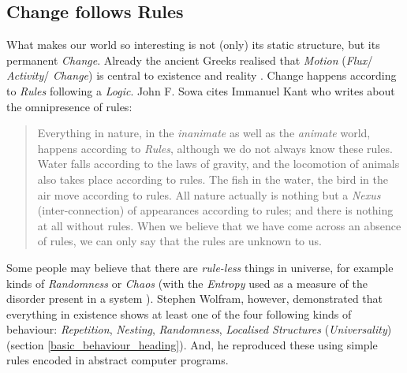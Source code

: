 %
%
%
%
%
%
%

\subsection{Change follows Rules}
\label{change_follows_rules_heading}

What makes our world so interesting is not (only) its static structure, but its
permanent \emph{Change}. Already the ancient Greeks realised that \emph{Motion}
(\emph{Flux}/ \emph{Activity}/ \emph{Change}) is central to existence and
reality \cite{spaceandmotion}. Change happens according to \emph{Rules}
following a \emph{Logic}. John F. Sowa \cite[p. 132]{sowa} cites Immanuel Kant
who writes about the omnipresence of rules:

\begin{quote}
    Everything in nature, in the \emph{inanimate} as well as the \emph{animate}
    world, happens according to \emph{Rules}, although we do not always know
    these rules. Water falls according to the laws of gravity, and the locomotion
    of animals also takes place according to rules. The fish in the water, the
    bird in the air move according to rules. All nature actually is nothing but
    a \emph{Nexus} (inter-connection) of appearances according to rules; and
    there is nothing at all without rules. When we believe that we have come
    across an absence of rules, we can only say that the rules are unknown to us.
\end{quote}

Some people may believe that there are \emph{rule-less} things in universe, for
example kinds of \emph{Randomness} or \emph{Chaos} (with the \emph{Entropy}
used as a measure of the disorder present in a system \cite{wikipedia}).
Stephen Wolfram, however, demonstrated that everything in existence shows at
least one of the four following kinds of behaviour: \emph{Repetition},
\emph{Nesting}, \emph{Randomness}, \emph{Localised Structures}
(\emph{Universality}) (section \ref{basic_behaviour_heading}). And, he
reproduced these using simple rules encoded in abstract computer programs.
